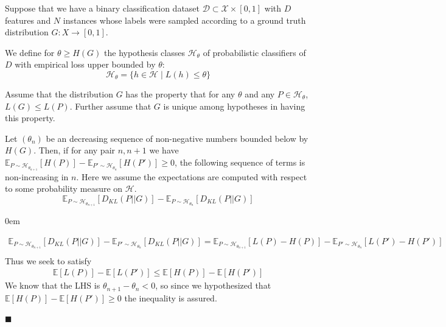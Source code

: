 \documentclass[12pt]{article}
\renewcommand{\qed}{\hfill$\blacksquare$}
\renewenvironment{proof}{\begin{addmargin}[1em]{0em}\begin{newproof}}{\end{newproof}\end{addmargin}\qed}
\newenvironment{theorem}[2][Theorem]{\begin{trivlist}
\item[\hskip \labelsep {\bfseries #1}\hskip \labelsep {\bfseries #2.}]}{\end{trivlist}}
\begin{document}
\begin{theorem}{1}
        Suppose that we have a binary classification dataset $\mathcal{D}\subset \mathcal{X}\times [0,1]$ with $D$ features and $N$ instances whose labels were sampled according to a ground truth distribution $G:X \rightarrow [0,1]$. 

    We define for $\theta \geq H(G)$ the hypothesis classes $\mathcal{H}_\theta$ of probabilistic classifiers of $D$ with empirical loss upper bounded by $\theta$:
    \begin{equation*}
        \mathcal{H}_\theta = \{h \in \mathcal{H} \mid L(h) \leq \theta\}
    \end{equation*}

    Assume that the distribution $G$ has the property that for any $\theta$ and any $P \in \mathcal{H}_\theta$, $L(G) \leq L(P)$. Further assume that $G$ is unique among hypotheses in having this property. 

    Let $(\theta_n)$ be an decreasing sequence of non-negative numbers bounded below by $H(G)$. Then, if for any pair $n,n+1$ we have $\mathds{E}_{P\sim \mathcal{H}_{\theta_{n+1}}}[H(P)] - \mathds{E}_{P'\sim \mathcal{H}_{\theta_{n}}}[H(P')] \geq 0$, the following sequence of terms is non-increasing in $n$. Here we assume the expectations are computed with respect to some probability measure on $\mathcal{H}$.
    \begin{equation*}
        \mathds{E}_{P\sim \mathcal{H}_{\theta_{n+1}}}[D_{KL}(P || G)] - \mathds{E}_{P\sim \mathcal{H}_{\theta_n}}[D_{KL}(P || G)] 
    \end{equation*}
\end{theorem}

\begin{proof}
    \begin{gather*}
         \mathds{E}_{P\sim \mathcal{H}_{\theta_{n+1}}}[D_{KL}(P || G)] - \mathds{E}_{P'\sim \mathcal{H}_{\theta_n}}[D_{KL}(P || G)] =  \mathds{E}_{P\sim \mathcal{H}_{\theta_{n+1}}}[L(P) - H(P)] - \mathds{E}_{P'\sim \mathcal{H}_{\theta_n}}[L(P')-H(P')]  \\
    \end{gather*}
    Thus we seek to satisfy
    \begin{gather*}
        \mathds{E}[L(P)]-\mathds{E}[L(P')] \leq \mathds{E}[H(P)]-\mathds{E}[H(P')]
    \end{gather*}
    We know that the LHS is $\theta_{n+1}-\theta_n < 0$, so since we hypothesized that $\mathds{E}[H(P)]-\mathds{E}[H(P')] \geq 0$ the inequality is assured. 
\end{proof}
\end{document}
